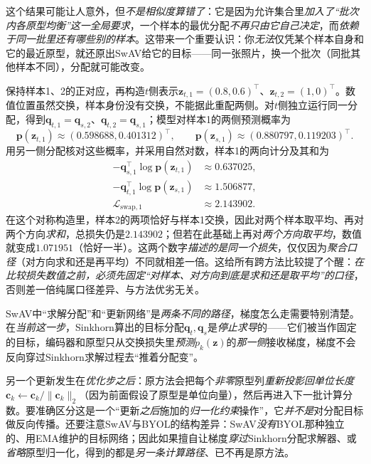 这个结果可能让人意外，但\emph{不是相似度算错了}：它是因为允许集合里\emph{加入了“批次内各原型均衡”这一全局要求}，一个样本的最优分配\emph{不再只由它自己决定}，而\emph{依赖于同一批里还有哪些别的样本}。这带来一个重要认识：你\emph{无法}仅凭某个样本自身和它的最近原型，就还原出SwAV给它的目标——同一张照片，换一个批次（同批其他样本不同），分配就可能改变。

保持样本1、2的正对应，再构造$t$侧表示$\bm{z}_{t,1}=(0.8,0.6)^{\top}$、$\bm{z}_{t,2}=(1,0)^{\top}$。数值位置虽然交换，样本身份没有交换，不能据此重配两侧。对$t$侧独立运行同一分配，得到$\bm{q}_{t,1}=\bm{q}_{s,2}$、$\bm{q}_{t,2}=\bm{q}_{s,1}$；模型对样本1的两侧预测概率为
\[
  \bm{p}(\bm{z}_{t,1})\approx(0.598688,0.401312)^{\top},
  \qquad
  \bm{p}(\bm{z}_{s,1})\approx(0.880797,0.119203)^{\top}.
\]
用另一侧分配核对这些概率，并采用自然对数，样本1的两向计分及其和为
\[
  \begin{aligned}
    -\bm{q}_{s,1}^{\top}\log\bm{p}(\bm{z}_{t,1})&\approx0.637025,\\
    -\bm{q}_{t,1}^{\top}\log\bm{p}(\bm{z}_{s,1})&\approx1.506877,\\
    \mathcal{L}_{\mathrm{swap},1}&\approx2.143902.
  \end{aligned}
\]
在这个对称构造里，样本2的两项恰好与样本1交换，因此对两个样本取平均、再对两个方向\emph{求和}，总损失仍是$2.143902$；但若在此基础上再对\emph{两个方向取平均}，数值就变成$1.071951$（恰好一半）。这两个数字\emph{描述的是同一个损失}，仅仅因为\emph{聚合口径}（对方向求和还是再平均）不同就相差一倍。这给所有跨方法比较提了个醒：\emph{在比较损失数值之前，必须先固定“对样本、对方向到底是求和还是取平均”的口径}，否则差一倍纯属口径差异、与方法优劣无关。

SwAV中“求解分配”和“更新网络”是\emph{两条不同的路径}，梯度怎么走需要特别清楚。在\emph{当前这一步}，Sinkhorn算出的目标分配$\bm{q}_t,\bm{q}_s$是\emph{停止求导}的——它们被当作固定的目标，编码器和原型只从交换损失里\emph{预测}$p_k(\bm{z})$的\emph{那一侧}接收梯度，梯度不会反向穿过Sinkhorn求解过程去“推着分配变”。

另一个更新发生在\emph{优化步之后}：原方法会把每个\emph{非零}原型列\emph{重新投影回单位长度}$\bm{c}_k\leftarrow\bm{c}_k/\lVert\bm{c}_k\rVert_2$（因为前面假设了原型是单位向量），然后再进入下一批计算分数。要准确区分这是一个“更新\emph{之后}施加的\emph{归一化约束}操作”，它\emph{并不是}对分配目标做反向传播。还要注意SwAV与BYOL的结构差异：SwAV\emph{没有}BYOL那种独立的、用EMA维护的目标网络；因此如果擅自让梯度\emph{穿过}Sinkhorn分配求解器、或\emph{省略}原型归一化，得到的都是\emph{另一条计算路径}、已不再是原方法。

